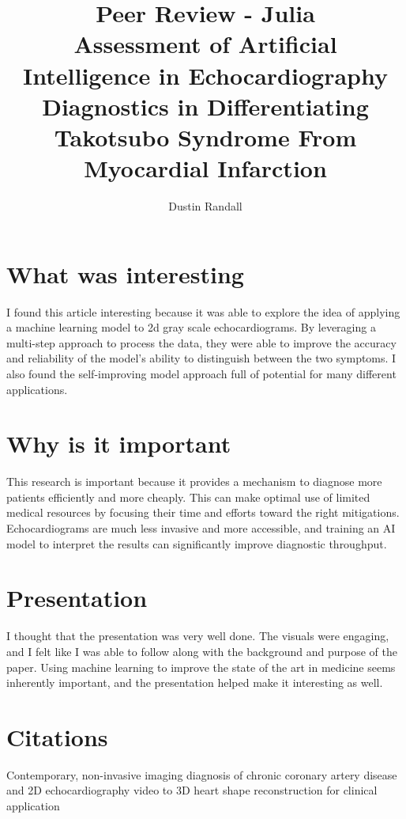 \documentclass{article}
\begin{document}
\title{Peer Review - Julia \\
Assessment of Artificial Intelligence in Echocardiography Diagnostics in Differentiating Takotsubo Syndrome From Myocardial Infarction}
\author{Dustin Randall}
\date{}
\maketitle

\section{What was interesting}
I found this article interesting because it was able to explore the idea of applying a machine learning model to 2d gray scale echocardiograms.
By leveraging a multi-step approach to process the data, they were able to improve the accuracy and reliability of the model's ability to distinguish between the two symptoms.
I also found the self-improving model approach full of potential for many different applications.

\section{Why is it important}
This research is important because it provides a mechanism to diagnose more patients efficiently and more cheaply.
This can make optimal use of limited medical resources by focusing their time and efforts toward the right mitigations.
Echocardiograms are much less invasive and more accessible, and training an AI model to interpret the results can significantly improve diagnostic throughput.

\section{Presentation}
I thought that the presentation was very well done.
The visuals were engaging, and I felt like I was able to follow along with the background and purpose of the paper.
Using machine learning to improve the state of the art in medicine seems inherently important, and the presentation helped make it interesting as well.

\section{Citations}
Contemporary, non-invasive imaging diagnosis of chronic coronary artery disease~\cite{bijl_contemporary_2025}
and {2D} echocardiography video to {3D} heart shape reconstruction for clinical application~\cite{laumer_2d_2025}



\end{document}
